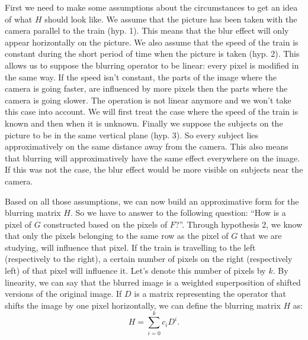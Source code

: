First we need to make some assumptions about the circumstances to get an idea of what $H$ should look like. We assume that the picture has been taken with the camera parallel to the train (hyp. 1). This means that the blur effect will only appear horizontally on the picture. We also assume that the speed of the train is constant during the short period of time when the picture is taken (hyp. 2). This allows us to suppose the blurring operator to be linear: every pixel is modified in the same way. If the speed isn't constant, the parts of the image where the camera is going faster, are influenced by more pixels then the parts where the camera is going slower. The operation is not linear anymore and we won't take this case into account. We will first treat the case where the speed of the train is known and then when it is unknown. Finally we suppose the subjects on the picture to be in the same vertical plane (hyp. 3). So every subject lies approximatively on the same distance away from the camera. This also means that blurring will approximatively have the same effect everywhere on the image. If this was not the case, the blur effect would be more visible on subjects near the camera.

Based on all those assumptions, we can now build an approximative form for the blurring matrix $H$. So we have to answer to the following question: ``How is a pixel of $G$ constructed based on the pixels of $F$?''. Through hypothesis 2, we know that only the pixels belonging to the same row as the pixel of $G$ that we are studying, will influence that pixel. If the train is travelling to the left (respectively to the right), a certain number of pixels on the right (respectively left) of that pixel will influence it. Let's denote this number of pixels by $k$. By linearity, we can say that the blurred image is a weighted superposition of shifted versions of the original image. If $D$ is a matrix representing the operator that shifts the image by one pixel horizontally, we can define the blurring matrix $H$ as:
\begin{equation}
H=\sum\limits_{i=0}^{k} c_i D^{i}.
\label{eqHtrain}
\end{equation}

